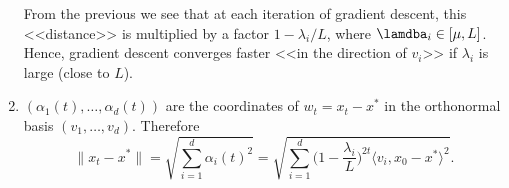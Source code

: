 \documentclass[11pt,nocut]{article}
\begin{document}
\begin{problem}[5 points]
\begin{enumerate}[label=\normalfont(\textbf{\alph*})]
			From the previous we see that at each iteration of gradient descent, this <<distance>> is multiplied by a factor $1-\lambda_i/L$, where $\lamdba_i \in [\mu,L]$. Hence, gradient descent converges faster <<in the direction of $v_i$>> if $\lambda_i$ is large (close to $L$).

		\item $(\alpha_1(t) , \dots, \alpha_d(t))$ are the coordinates of $w_t = x_t - x^*$ in the orthonormal basis $(v_1, \dots,v_d)$. Therefore
			$$
			\|x_t - x^* \| = \sqrt{\sum_{i=1}^d \alpha_i(t)^2} = \sqrt{\sum_{i=1}^d \Big(1-\frac{\lambda_i}{L}\Big)^{\!2t} \big\langle v_i, x_0-x^* \big\rangle^2}.
			$$
	\end{enumerate}
\end{problem}



\vspace{1cm}
\centerline{}

%
%
\end{document}
